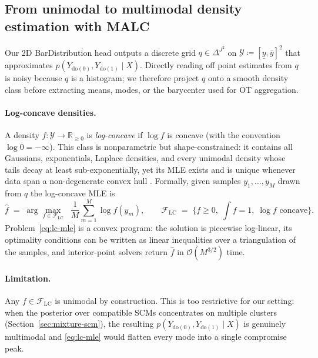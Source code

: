 \subsection{From unimodal to multimodal density estimation with MALC}
\label{sec:malc-multimodal}

Our 2D BarDistribution head outputs a discrete grid
$q \in \Delta^{J^2}$ on
$\mathcal{Y} \coloneqq [\underline{y}, \overline{y}]^2$
that approximates
$p(Y_{\mathrm{do}(0)}, Y_{\mathrm{do}(1)} \mid X)$.
Directly reading off point estimates from $q$ is noisy because $q$ is a
histogram; we therefore project $q$ onto a smooth density class before
extracting means, modes, or the barycenter used for OT aggregation.

\paragraph{Log-concave densities.}
A density $f: \mathcal{Y} \to \mathbb{R}_{\ge 0}$ is \emph{log-concave} if
$\log f$ is concave (with the convention $\log 0 = -\infty$).
This class is nonparametric but shape-constrained: it contains all
Gaussians, exponentials, Laplace densities, and every unimodal density
whose tails decay at least sub-exponentially, yet its MLE exists and is
unique whenever data span a non-degenerate convex hull
\citep{cule2010maximum,samworth2018recent}.
Formally, given samples $y_1, \dots, y_M$ drawn from $q$ the log-concave MLE is
\begin{equation}
\hat{f} \;=\; \arg\!\max_{f \in \mathcal{F}_{\mathrm{LC}}}
\;\;\frac{1}{M}\sum_{m=1}^{M} \log f(y_m),
\qquad
\mathcal{F}_{\mathrm{LC}}
\;=\; \{f \ge 0,\; \int f \!=\! 1,\; \log f \text{ concave}\}.
\label{eq:lc-mle}
\end{equation}
Problem~\eqref{eq:lc-mle} is a convex program: the solution is piecewise
log-linear, its optimality conditions can be written as linear inequalities
over a triangulation of the samples, and interior-point solvers return
$\hat{f}$ in $\mathcal{O}(M^{3/2})$ time.

\paragraph{Limitation.}
Any $f \in \mathcal{F}_{\mathrm{LC}}$ is unimodal by construction. This is
too restrictive for our setting: when the posterior over compatible SCMs
concentrates on multiple clusters (Section~\ref{sec:mixture-scm}), the
resulting $p(Y_{\mathrm{do}(0)}, Y_{\mathrm{do}(1)} \mid X)$ is genuinely
multimodal and \eqref{eq:lc-mle} would flatten every mode into a single
compromise peak.

